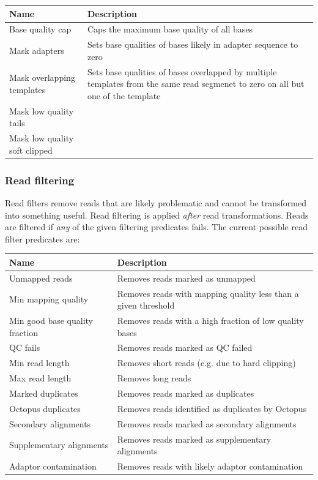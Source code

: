 \documentclass{article}
\begin{document}
\begin{center}
\begin{tabular}{ll}
Name & Description \\
\hline
Base quality cap & Caps the maximum base quality of all bases \\
Mask adapters & Sets base qualities of bases likely in adapter sequence to zero \\
Mask overlapping templates & Sets base qualities of bases overlapped by multiple templates from the same read segmenet to zero on all but one of the template \\
Mask low quality tails &  \\
Mask low quality soft clipped &  \\
\hline
\end{tabular}
\end{center}

\subsubsection{Read filtering}

Read filters remove reads that are likely problematic and cannot be transformed into something useful. Read filtering is applied \emph{after} read transformations. Reads are filtered if \emph{any} of the given filtering predicates fails. The current possible read filter predicates are:

\begin{center}
\begin{tabular}{ll}
Name & Description \\
\hline
Unmapped reads & Removes reads marked as unmapped \\
Min mapping quality & Removes reads with mapping quality less than a given threshold \\
Min good base quality fraction & Removes reads with a high fraction of low quality bases \\
QC fails & Removes reads marked as QC failed \\
Min read length & Removes short reads (e.g. due to hard clipping) \\
Max read length & Removes long reads \\
Marked duplicates & Removes reads marked as duplicates \\
Octopus duplicates & Removes reads identified as duplicates by Octopus \\
Secondary alignments & Removes reads marked as secondary alignments \\
Supplementary alignments & Removes reads marked as supplementary alignments \\
Adaptor contamination & Removes reads with likely adaptor contamination \\
\hline
\end{tabular}
\end{center}
\end{document}
